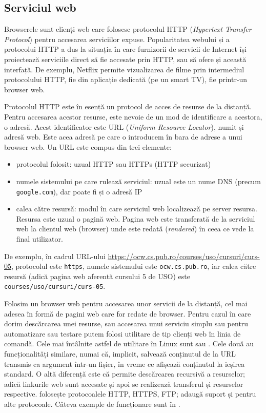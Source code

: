 \subsection{Serviciul web}
\label{sec:net:apps:web}

Browserele sunt clienți web care folosesc protocolul HTTP (\textit{Hypertext Transfer Protocol}) pentru accesarea serviciilor expuse.
Popularitatea webului și a protocolui HTTP a dus la situația în care furnizorii de servicii de Internet își proiectează serviciile direct să fie accesate prin HTTP, sau să ofere și această interfață.
De exemplu, Netflix permite vizualizarea de filme prin intermediul protocolului HTTP, fie din aplicație dedicată (pe un smart TV), fie printr-un browser web.

Protocolul HTTP este în esență un protocol de acces de resurse de la distanță.
Pentru accesarea acestor resurse, este nevoie de un mod de identificare a acestora, o adresă.
Acest identificator este URL (\textit{Uniform Resource Locator}), numit și adresă web.
Este acea adresă pe care o introducem în bara de adrese a unui browser web.
Un URL este compus din trei elemente:
\begin{itemize}
  \item protocolul folosit: uzual HTTP sau HTTPs (HTTP securizat)
  \item numele sistemului pe care rulează serviciul: uzual este un nume DNS (precum \texttt{google.com}), dar poate fi și o adresă IP
  \item calea către resursă: modul în care serviciul web localizează pe server resursa.
    Resursa este uzual o pagină web.
    Pagina web este transferată de la serviciul web la clientul web (browser) unde este redată (\textit{rendered}) în ceea ce vede la final utilizator.
\end{itemize}

De exemplu, în cadrul URL-ului \url{https://ocw.cs.pub.ro/courses/uso/cursuri/curs-05}, protocolul este \texttt{https}, numele sistemului este \texttt{ocw.cs.pub.ro}, iar calea către resursă (adică pagina web aferentă cursului 5 de USO) este \texttt{courses/uso/cursuri/curs-05}.

Folosim un browser web pentru accesarea unor servicii de la distanță, cel mai adesea în formă de pagini web care for redate de browser.
Pentru cazul în care dorim descărcarea unei resurse, sau accesarea unui serviciu simplu sau pentru automatizare sau testare putem folosi utilitare de tip clienți web în linia de comandă.
Cele mai întâlnite astfel de utilitare în Linux sunt  sau .
Cele două au funcționalități similare, numai că, implicit,  salvează conținutul de la URL transmis ca argument într-un fișier, în vreme ce  afișează conținutul la ieșirea standard.
O altă diferență este că  permite descărcarea recursivă a resurselor; adică linkurile web sunt accesate și apoi se realizează transferul și resurselor respective.
 folosește protocoalele HTTP, HTTPS, FTP;  adaugă suport și pentru alte protocoale.
Câteva exemple de funcționare sunt în .

